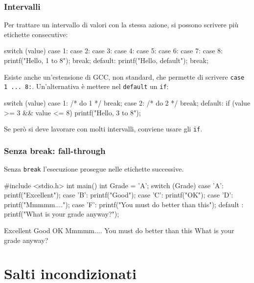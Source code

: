 \documentclass[11pt,a4paper]{article}
\begin{document}
\subsubsection*{Intervalli}

Per trattare un intervallo di valori con la stessa azione, si possono scrivere più etichette consecutive:
\begin{codice}
switch (value)
{
    case 1:
    case 2:
    case 3:
    case 4:
    case 5:
    case 6:
    case 7:
    case 8:
        printf("Hello, 1 to 8\n");
        break;
    default:
        printf("Hello, default\n");
        break;
}
\end{codice}
Esiste anche un'estensione di GCC, non standard, che permette di scrivere \lstinline|case 1 ... 8:|. Un'alternativa è mettere nel \lstinline|default| un \lstinline|if|:
\begin{codice}
switch (value) {
    case 1:
        /* do 1 */
        break;
    case 2:
        /* do 2 */
        break;
    default:
        if (value >= 3 && value <= 8)
            printf("Hello, 3 to 8\n");
}
\end{codice}
Se però si deve lavorare con molti intervalli, conviene usare gli \lstinline|if|.

\subsubsection*{Senza break: fall-through}

Senza \lstinline|break| l'esecuzione prosegue nelle etichette successive.
\begin{esempio}
\begin{codice}
#include <stdio.h>
int main()
{
    int Grade = 'A';
    switch (Grade)
    {
        case 'A': printf("Excellent\n");
        case 'B': printf("Good\n");
        case 'C': printf("OK\n");
        case 'D': printf("Mmmmm....\n");
        case 'F': printf("You must do better than this\n");
        default : printf("What is your grade anyway?\n");
    }
}
\end{codice}
\begin{risultato}
Excellent
Good
OK
Mmmmm....
You must do better than this
What is your grade anyway?
\end{risultato}
\end{esempio}

\section{Salti incondizionati}
\end{document}
